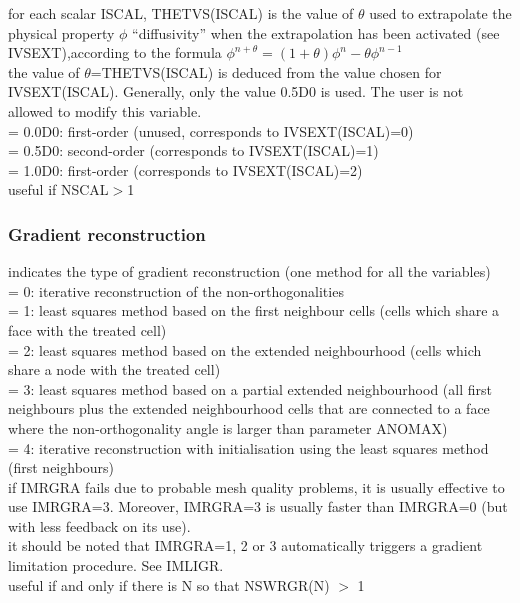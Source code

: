 {for each scalar ISCAL, THETVS(ISCAL) is the value of $\theta$ used to
extrapolate the physical property $\phi$ ``diffusivity'' when the extrapolation has
been activated (see IVSEXT),according to the
formula $\phi^{n+\theta}=(1+\theta)\phi^n-\theta \phi^{n-1}$\\
the value of $\theta$=THETVS(ISCAL) is deduced from the value chosen for
IVSEXT(ISCAL). Generally, only the value 0.5D0 is used. The user is not
allowed to modify this variable.\\
\hspace*{1.3cm}= 0.0D0: first-order (unused, corresponds to
IVSEXT(ISCAL)=0)\\ 
\hspace*{1.3cm}= 0.5D0: second-order (corresponds to IVSEXT(ISCAL)=1) \\
\hspace*{1.3cm}= 1.0D0: first-order (corresponds to IVSEXT(ISCAL)=2) \\
useful if NSCAL$>$1}


\subsubsection{Gradient reconstruction}

{indicates the type of gradient reconstruction (one method for all the
variables)\\ 
\hspace*{1.3cm}= 0: iterative reconstruction of the non-orthogonalities\\
\hspace*{1.3cm}= 1: least squares method based on the first neighbour cells
(cells which share a face with the treated cell)\\
\hspace*{1.3cm}= 2: least squares method based on the extended neighbourhood
(cells which share a node with the treated cell)\\ 
\hspace*{1.3cm}= 3: least squares method based on a partial extended
neighbourhood (all first neighbours plus the extended neighbourhood cells that
are connected to a face where the non-orthogonality angle is larger than
parameter ANOMAX)\\
\hspace*{1.3cm}= 4: iterative reconstruction with initialisation using the least
squares method (first neighbours)\\
if IMRGRA fails due to probable mesh quality problems, it is usually effective
to use IMRGRA=3. Moreover, IMRGRA=3 is usually faster than IMRGRA=0 (but with
less feedback on its use).\\
it should be noted that IMRGRA=1, 2 or 3 automatically triggers a gradient
limitation procedure. See IMLIGR.\\
useful if and only if there is N so that NSWRGR(N) $>$ 1}


